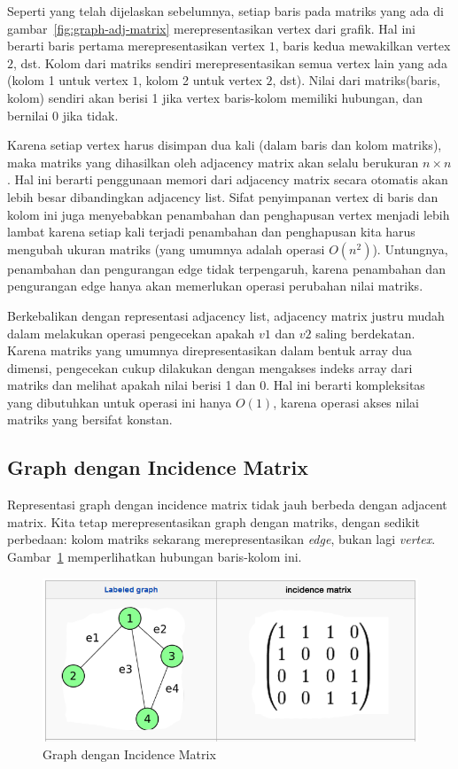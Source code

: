 Seperti yang telah dijelaskan sebelumnya, setiap baris pada matriks yang ada di gambar~\ref{fig:graph-adj-matrix} merepresentasikan vertex dari grafik. Hal ini berarti baris pertama merepresentasikan vertex $1$, baris kedua mewakilkan vertex $2$, dst. Kolom dari matriks sendiri merepresentasikan semua vertex lain yang ada (kolom 1 untuk vertex $1$, kolom 2 untuk vertex $2$, dst). Nilai dari matriks(baris, kolom) sendiri akan berisi 1 jika vertex baris-kolom memiliki hubungan, dan bernilai 0 jika tidak.

Karena setiap vertex harus disimpan dua kali (dalam baris dan kolom matriks), maka matriks yang dihasilkan oleh adjacency matrix akan selalu berukuran $n \times n$. Hal ini berarti penggunaan memori dari adjacency matrix secara otomatis akan lebih besar dibandingkan adjacency list. Sifat penyimpanan vertex di baris dan kolom ini juga menyebabkan penambahan dan penghapusan vertex menjadi lebih lambat karena setiap kali terjadi penambahan dan penghapusan kita harus mengubah ukuran matriks (yang umumnya adalah operasi $O(n^2)$). Untungnya, penambahan dan pengurangan edge tidak terpengaruh, karena penambahan dan pengurangan edge hanya akan memerlukan operasi perubahan nilai matriks.

Berkebalikan dengan representasi adjacency list, adjacency matrix justru mudah dalam melakukan operasi pengecekan apakah $v1$ dan $v2$ saling berdekatan. Karena matriks yang umumnya direpresentasikan dalam bentuk array dua dimensi, pengecekan cukup dilakukan dengan mengakses indeks array dari matriks dan melihat apakah nilai berisi 1 dan 0. Hal ini berarti kompleksitas yang dibutuhkan untuk operasi ini hanya $O(1)$, karena operasi akses nilai matriks yang bersifat konstan.

\subsection{Graph dengan Incidence Matrix}

Representasi graph dengan incidence matrix tidak jauh berbeda dengan adjacent matrix. Kita tetap merepresentasikan graph dengan matriks, dengan sedikit perbedaan: kolom matriks sekarang merepresentasikan \textit{edge}, bukan lagi \textit{vertex}. Gambar~\ref{fig:graph-incidence-matrix} memperlihatkan hubungan baris-kolom ini.

\begin{figure}
    \centering
    \includegraphics[width=\textwidth,keepaspectratio]{fig/Graph-IncidenceMatrix.png}%
	\caption{Graph dengan Incidence Matrix}%
	\label{fig:graph-incidence-matrix}%
\end{figure}

